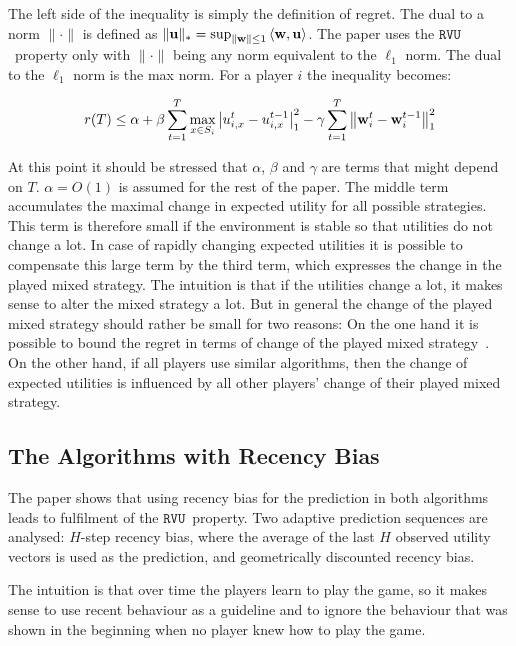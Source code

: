 \documentclass[a4paper]{article}
\theoremstyle{definition}
\newcommand{\myprop}{\ensuremath{\texttt{RVU}}}
\renewcommand{\vec}[1]{\ensuremath{{\bf #1}}}
\newcommand{\dotp}[2]{\ensuremath{\left\langle #1, #2 \right\rangle}}
\begin{document}
The left side of the inequality is simply the definition of regret.
The dual to a norm $\|\cdot\|$ is defined as $\|\vec{u}\|_* = \sup_{\|\vec{w}\|
  \leq 1} \dotp{\vec{w}}{\vec{u}}$.
The paper uses the \myprop~property only with
 $\|\cdot\|$ being any norm equivalent to the
 $\ell_1$ norm.
 The dual to the $\ell_1$ norm is the max norm.
 For a player $i$ the inequality becomes:

 \begin{equation*}
   r(T) \leq \alpha
   +\beta \sum_{t=1}^{T} \max_{x \in S_i} \left| u_{i,x}^t - u_{i,x}^{t-1} \right|_1^2 -
   \gamma\sum_{t=1}^{T} \left\|\vec{w}_i^{t} - \vec{w}_i^{t-1}\right\|^2_1
 \end{equation*}  

At this point it should be stressed that $\alpha$, $\beta$ and $\gamma$
are terms that might depend on $T$.
$\alpha = O(1)$ is assumed for the rest of the paper.
The middle term accumulates the maximal change in expected utility for
all possible strategies.
This term is therefore small if the environment is stable so that
utilities do not change a lot.
In case of rapidly changing expected utilities it is possible to
compensate this large term by the third term, which expresses the change in the
played mixed strategy.
The intuition is that if the utilities change a lot, it makes sense to
alter  the mixed strategy a lot.
But in general the change of the played mixed strategy should rather
be small for two reasons: On the one hand it is possible to bound the regret in
terms of change of the played mixed strategy~\cite[p.151, Lemma
7]{Stanford}.
On the other hand, if all players use similar algorithms, then the
change of expected utilities is influenced by all other players'
change of their played mixed strategy.


\subsection{The Algorithms with Recency Bias}
\label{sec:algor-with-recency}

The paper shows that using recency bias for the prediction in both
algorithms leads to fulfilment of the \myprop~property.
Two adaptive prediction sequences are analysed:
$H$-step recency bias, where the average of the last $H$ observed
utility vectors is used as the prediction, and geometrically
discounted recency bias.

The intuition is that over time the players learn to play the game, so
it makes sense to use recent behaviour as a guideline and to ignore the
behaviour that was shown in the beginning when no player knew how to
play the game.
\end{document}
